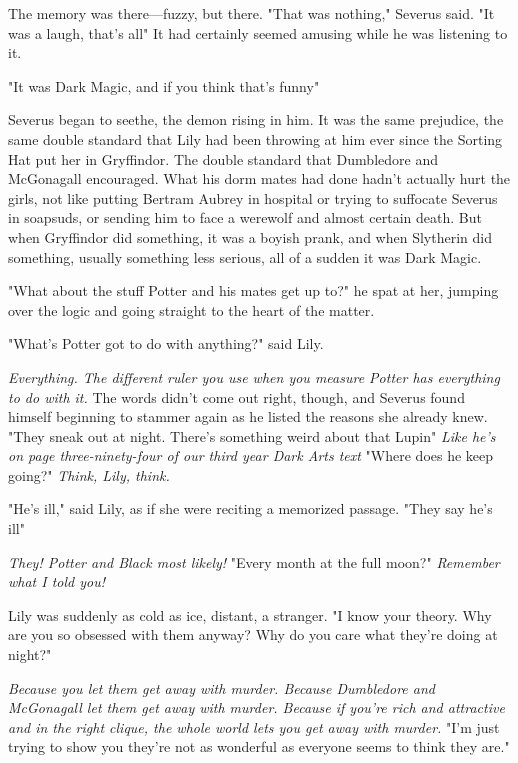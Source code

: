 The memory was there—fuzzy, but there. "That was nothing," Severus said. "It was a laugh, that's all{\el}" It had certainly seemed amusing while he was listening to it.

"It was Dark Magic, and if you think that's funny{\el}"

Severus began to seethe, the demon rising in him. It was the same prejudice, the same double standard that Lily had been throwing at him ever since the Sorting Hat put her in Gryffindor. The double standard that Dumbledore and McGonagall encouraged. What his dorm mates had done hadn't actually hurt the girls, not like putting Bertram Aubrey in hospital or trying to suffocate Severus in soapsuds, or sending him to face a werewolf and almost certain death. But when Gryffindor did something, it was a boyish prank, and when Slytherin did something, usually something less serious, all of a sudden it was Dark Magic.

"What about the stuff Potter and his mates get up to?" he spat at her, jumping over the logic and going straight to the heart of the matter.

"What's Potter got to do with anything?" said Lily.

\emph{Everything. The different ruler you use when you measure Potter has everything to do with it.} The words didn't come out right, though, and Severus found himself beginning to stammer again as he listed the reasons she already knew. "They{\el} sneak out at night. There's{\el} something weird about that Lupin{\el}" \emph{Like he's on page three-ninety-four of our third year Dark Arts text{\el}} "Where does he keep going?" \emph{Think, Lily, think.}

"He's ill," said Lily, as if she were reciting a memorized passage. "They say he's ill{\el}"

\emph{They! Potter and Black most likely!} "Every month at the full moon?" \emph{Remember what I told you!}

Lily was suddenly as cold as ice, distant, a stranger. "I know your theory. Why are you so obsessed with them anyway? Why do you care what they're doing at night?"

\emph{Because you let them get away with murder. Because Dumbledore and McGonagall let them get away with murder. Because if you're rich and attractive and in the right clique, the whole world lets you get away with murder.} "I'm just trying to{\el} show you they're not as{\el} wonderful as everyone seems to{\el} think they are."

